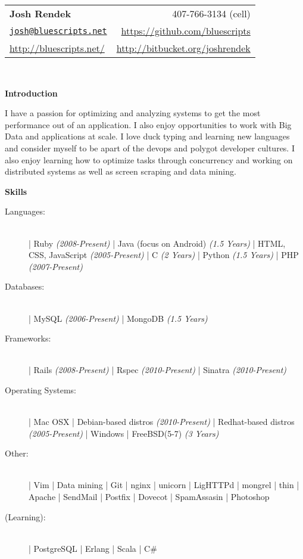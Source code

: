 \documentclass[letterpaper,11pt]{article}
\newcommand{\resheading}[1]{{\large \colorbox{myblue}{\begin{minipage}{\textwidth}{\textbf{#1 \vphantom{p\^{E}}}}\end{minipage}}}}
\begin{document}
\newcommand{\infoheader}{
\begin{tabular*}{7.5in}{l@{\extracolsep{\fill}}r}
\textbf{\LARGE Josh Rendek }  & 407-766-3134 (cell) \\ 
\href{mailto:josh@bluescripts.net}{\nolinkurl{josh@bluescripts.net}} & \url{https://github.com/bluescripts} \\
\url{http://bluescripts.net/} & \url{http://bitbucket.org/joshrendek} \\
\end{tabular*}
\\

\vspace{0.1in}
}

\newcommand{\pagebreakwithheader}{\pagebreak\infoheader}

\infoheader

\resheading{Introduction}
I have a passion for optimizing and analyzing systems to get the most performance out of an application. I also enjoy opportunities to work with Big Data and applications at scale. I love duck typing and learning new languages and consider myself to be apart of the devops and polygot developer cultures. I also enjoy learning how to optimize tasks through concurrency and working on distributed systems as well as screen scraping and data mining.
\linebreak

\resheading{Skills}

\begin{description}
    \item[Languages:] \hfill \\
        | Ruby \textit{(2008-Present)} 
        | Java (focus on Android) \textit{(1.5 Years)} 
        | HTML, CSS, JavaScript \textit{(2005-Present)} 
        | C \textit{(2 Years)} 
        | Python \textit{(1.5 Years)} 
        | PHP \textit{(2007-Present)}
    \item[Databases:] \hfill  \\
        | MySQL \textit{(2006-Present)} 
        | MongoDB \textit{(1.5 Years)}
    \item[Frameworks:] \hfill \\
        | Rails \textit{(2008-Present)} 
        | Rspec \textit{(2010-Present)}    
        | Sinatra \textit{(2010-Present)} 
    \item[Operating Systems:] \hfill \\
        | Mac OSX   
        | Debian-based distros \textit{(2010-Present)}
        | Redhat-based distros \textit{(2005-Present)}
        | Windows   
        | FreeBSD(5-7) \textit{(3 Years)}
    \item[Other:] \hfill \\
        | Vim       
        | Data mining 
        | Git       
        | nginx     
        | unicorn   
        | LigHTTPd  
        | mongrel   
        | thin      
        | Apache   
        | SendMail
        | Postfix  
        | Dovecot 
        | SpamAssasin 
        | Photoshop 
    \item[(Learning):] \hfill \\
        | PostgreSQL
        | Erlang 
        | Scala 
        | C\#
\end{description}
\end{document}
